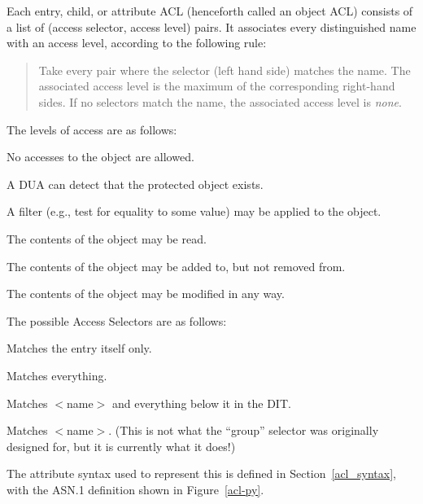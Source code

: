 Each entry, child, or attribute ACL (henceforth called an object ACL) consists
of a list of (access selector, access level) pairs. It associates every
distinguished name with an access level, according to the following rule:

\begin{quote} 
Take every pair where the selector
(left hand side) matches the name. The associated access level is the maximum 
of the corresponding right-hand sides. If no selectors match the name, the
associated access level is {\em none}.
\end{quote}

The levels of access are as follows:

\begin{describe}
\item
[\verb+None+:]
No accesses to the object are allowed.
\item
[\verb+Detect+:]
A DUA can detect that the protected object exists.
\item
[\verb+Compare+:]
A filter (e.g., test for equality to some value) may be applied to the object.
\item
[\verb+Read+:]
The contents of the object may be read.
\item
[\verb+Add+:]
The contents of the object may be added to, but not removed from.
\item
[\verb+Write+:]
The contents of the object may be modified in any way.
\end{describe}

The possible Access Selectors are as follows:

\begin{describe}
\item
[\verb+Entry+:]
Matches the entry itself only.
\item
[\verb+Other+:]
Matches everything.
\item
[\verb+Prefix $<$name$>$+:]
Matches $<$name$>$ and everything below it in the DIT.
\item
[\verb+Group $<$name$>$+:]
Matches $<$name$>$.
(This is not what the ``group'' selector was originally designed for, but it is
currently what it does!)

\end{describe}

The attribute syntax used to represent this is defined in Section~\ref{acl_syntax}, 
with the ASN.1 definition shown in Figure~\ref{acl-py}.




